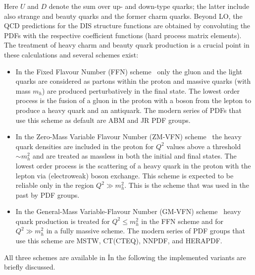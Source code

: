 Here $U$ and $D$ denote the sum over up- and down-type quarks;
the latter include also strange and beauty quarks and 
the former charm quarks.
%
Beyond LO, 
the QCD predictions for the DIS structure functions are obtained by convoluting 
the PDFs with the respective coefficient functions (hard process matrix elements).
%
The treatment of 
heavy charm and beauty quark production is a crucial point in these calculations
and several schemes exist:
\begin{itemize}
\item
In the Fixed Flavour Number (FFN) 
scheme~\cite{Laenen:1992, Laenen:1993, Riem:1995}
 only the gluon and the light quarks are considered
as partons within the proton and massive 
quarks (with mass $m_h$) are produced perturbatively in the final state.
The lowest order process is the fusion of a gluon in the proton
with a boson from the lepton to produce a heavy quark and an antiquark.
The modern series of PDFs that use this scheme as default are ABM and JR PDF groups.
\item
In the Zero-Mass Variable Flavour Number (ZM-VFN) scheme~\cite{ZMVFNpub} the
heavy quark densities are included in the proton for $Q^2$ values above a threshold $\sim m_h^2$
and
are treated as massless in both the initial 
and final states. The lowest order process is the scattering
of a heavy quark in the proton with the lepton via (electroweak) boson exchange.
This scheme is expected to be reliable only in the region $Q^2 \gg m_h^2$.
This is the scheme that was used in the past by PDF groups.
\item
In the General-Mass Variable-Flavour Number (GM-VFN)
scheme~\cite{VFN} heavy quark production is treated for
$Q^2 \le m_h^2$ in the FFN scheme and for $Q^2 \gg m_h^2$
in a fully massive scheme. 
The modern series of PDF groups that use this scheme are MSTW, CT(CTEQ), NNPDF, and HERAPDF.
\end{itemize}
All three schemes are available in \fitter\. In the following
the implemented variants are briefly discussed.
% 
